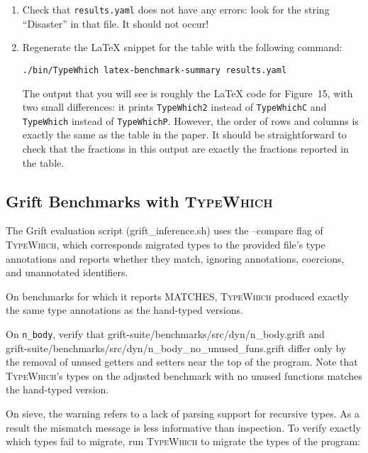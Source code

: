 \documentclass{book}
\newcommand{\system}{\textsc{TypeWhich}\xspace}
\begin{document}
\begin{enumerate}

\item Check that \texttt{results.yaml} does not have any errors: look for the
string ``Disaster'' in that file. It should not occur!

\item Regenerate the LaTeX snippet for the table with the following command:

\begin{verbatim}
./bin/TypeWhich latex-benchmark-summary results.yaml     
\end{verbatim}
The output that you will see is roughly the LaTeX code for Figure~15,
with two small differences: it prints \texttt{TypeWhich2} instead of \texttt{TypeWhichC}
and \texttt{TypeWhich} instead of \texttt{TypeWhichP}. However, the order of
rows and columns is exactly the same as the table in the paper. It should be
straightforward to check that the fractions in this output are exactly the fractions
reported in the table.

\end{enumerate}

\subsection{Grift Benchmarks with \system}

The Grift evaluation script (grift\_inference.sh) uses the --compare flag
of \system, which corresponds migrated types to the provided file's type
annotations and reports whether they match, ignoring annotations, coercions,
and unannotated identifiers.

On benchmarks for which it reports MATCHES, \system produced exactly the same type
annotations as the hand-typed versions.

On \texttt{n\_body}, verify that grift-suite/benchmarks/src/dyn/n\_body.grift
and \\
grift-suite/benchmarks/src/dyn/n\_body\_no\_unused\_funs.grift differ only
by the removal of unused getters and setters near the top of the
program. Note that \system's types on the adjusted benchmark with no unused
functions matches the hand-typed version.

On sieve, the warning refers to a lack of parsing support for recursive types.
As a result the mismatch message is less informative than inspection. To verify
exactly which types fail to migrate, run \system to migrate the types of the
program:
\end{document}

